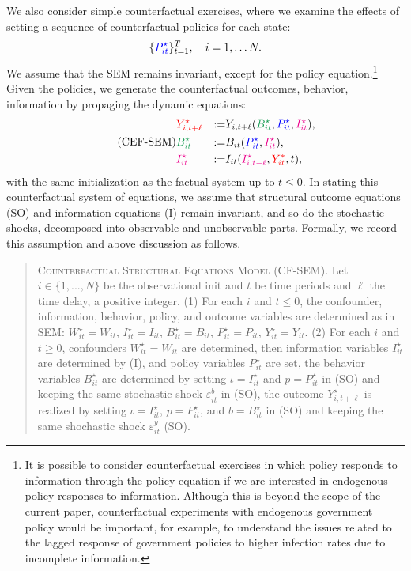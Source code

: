 \documentclass[11pt,reqno,letter]{amsart}
\theoremstyle{definition}
\def\bcolor{\color{ForestGreen}}
\def\pcolor{\color{blue}}
\def\icolor{\color{magenta}}
\def\ycolor{\color{red}}
\begin{document}
We  also consider simple counterfactual exercises, where we examine the effects of setting
a sequence of counterfactual policies for each state:
$$
\{{\pcolor P^\star_{it}} \}_{t=1}^T, \quad i=1, \ldots N.
$$
We assume that the SEM remains invariant, except for the policy equation.\footnote{It is possible to consider counterfactual exercises in which policy  responds to information through the policy equation if we are interested in endogenous policy responses to information. Although this is beyond the scope of the current paper, counterfactual experiments with endogenous government policy would be important, for example, to understand the issues related to the lagged response of government policies to higher infection rates due to incomplete information. } Given the policies, we generate the counterfactual
outcomes, behavior, information by propaging the dynamic equations:
\begin{equation} \label{eqn:CF-SEM} \tag{CEF-SEM}
  \begin{aligned}
& {\ycolor Y^\star_{i,t+\ell}}  & := & Y_{i,t+\ell} ( {\bcolor B^\star_{it} } , {\pcolor P^\star_{it}}, {\icolor I^\star_{it}}), \\
& {\bcolor B^\star_{it} } & := &   B_{it}({\pcolor P^\star_{it} } ,{\icolor I^\star_{it}}), \\
& {\icolor I^\star_{it} }& := &  I_{it}({\icolor I^\star_{i,t-\ell}}, {\ycolor Y^*_{it}}, t),  \end{aligned}
\end{equation}
with the same initialization as the factual system up to $t \leq 0$. In stating this counterfactual system of equations, we assume that structural outcome equations (SO) and information equations (I) remain invariant, and so do the stochastic shocks, decomposed
into observable and unobservable parts. Formally, we record this assumption and above discussion as follows.


\begin{quote}
\textsc{Counterfactual Structural Equations Model (CF-SEM)}.  Let $i \in \{1,..., N\}$ be the observational init and $t$ be time periods and $\ell$ the time delay, a positive integer. (1) For each $i$ and $t \leq 0$, the confounder, information, behavior, policy, and outcome variables are determined as in SEM: $W^\star_{it}= W_{it}$, $I^\star_{it}= I_{it}$,  $B^\star_{it} = B_{it}$, $P^\star_{it}=P_{it}$, $Y^\star_{it} =Y_{it}$.  (2) For each $i$ and $t \geq 0$, confounders $W^\star_{it} =W_{it}$ are determined, then information variables $I^\star_{it}$ are determined  by (I), and policy variables $P^\star_{it}$ are set,  the behavior variables $B^\star_{it}$ are determined by setting $\iota = I^\star_{it}$ and $p= P^\star_{it}$ in  (SO) and keeping  the same stochastic shock $\varepsilon^b_{it}$ in (SO), the outcome $Y^\star_{i, t + \ell}$ is realized by setting $\iota = I^\star_{it}$, $p= P^\star_{it}$, and $b = B^\star_{it}$ in  (SO) and keeping the same shochastic shock $\varepsilon^y_{it}$  (SO).
\end{quote}
\end{document}
